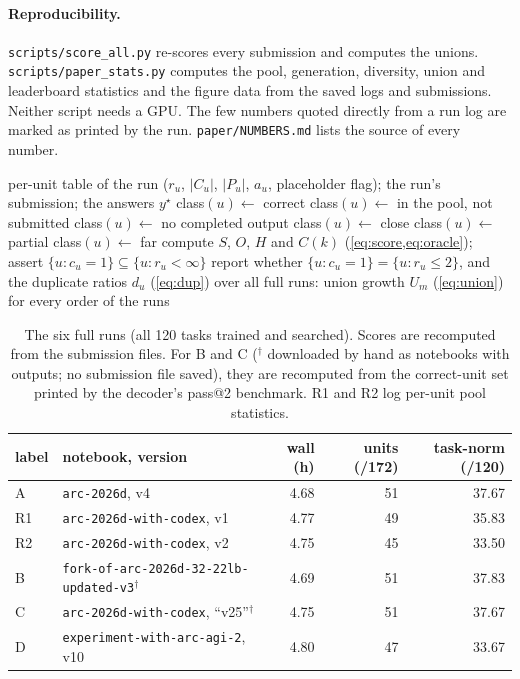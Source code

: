\documentclass[11pt]{article}
\newcommand{\code}[1]{\texttt{#1}}
\newcommand{\R}[1]{R#1}
\begin{document}
\paragraph{Reproducibility.}
\code{scripts/score\_all.py} re-scores every submission and computes the unions. \code{scripts/paper\_stats.py} computes the pool, generation, diversity, union and leaderboard statistics and the figure data from the saved logs and submissions. Neither script needs a GPU.
The few numbers quoted directly from a run log are marked as printed by the run. \code{paper/NUMBERS.md} lists the source of every number.

\begin{algorithm}[t]
\caption{Pool decomposition of one logged run (\code{scripts/paper\_stats.py}).}
\label{alg:measure}
\begin{algorithmic}[1]
\Require per-unit table of the run ($r_u$, $|C_u|$, $|P_u|$, $a_u$, placeholder flag); the run's submission; the answers $y^\star$
   \State class$(u) \gets$ correct 
   \State class$(u) \gets$ in the pool, not submitted
   \State class$(u) \gets$ no completed output
   \State class$(u) \gets$ close 
   \State class$(u) \gets$ partial
  \Else \State class$(u) \gets$ far
  \EndIf
\EndFor
\State compute $S$, $O$, $H$ and $C(k)$ (\cref{eq:score,eq:oracle}); assert $\{u : c_u = 1\} \subseteq \{u : r_u < \infty\}$
\State report whether $\{u : c_u = 1\} = \{u : r_u \le 2\}$, and the duplicate ratios $d_u$ (\cref{eq:dup})
\State over all full runs: union growth $U_m$ (\cref{eq:union}) for every order of the runs
\end{algorithmic}
\end{algorithm}

\begin{table}[t]
\centering
\caption{The six full runs (all 120 tasks trained and searched). Scores are recomputed from the submission files. For B and C ($^\dagger$ downloaded by hand as notebooks with outputs; no submission file saved), they are recomputed from the correct-unit set printed by the decoder's pass@2 benchmark. \R{1} and \R{2} log per-unit pool statistics.}
\label{tab:runs}
\small
\begin{tabular}{llrrr}
\toprule
label & notebook, version & wall (h) & units (/172) & task-norm (/120) \\
\midrule
A & \code{arc-2026d}, v4 & 4.68 & 51 & 37.67 \\
\R{1} & \code{arc-2026d-with-codex}, v1 & 4.77 & 49 & 35.83 \\
\R{2} & \code{arc-2026d-with-codex}, v2 & 4.75 & 45 & 33.50 \\
B & \code{fork-of-arc-2026d-32-22lb-updated-v3}$^\dagger$ & 4.69 & 51 & 37.83 \\
C & \code{arc-2026d-with-codex}, ``v25''$^\dagger$ & 4.75 & 51 & 37.67 \\
D & \code{experiment-with-arc-agi-2}, v10 & 4.80 & 47 & 33.67 \\
\bottomrule
\end{tabular}
\end{table}
\end{document}
